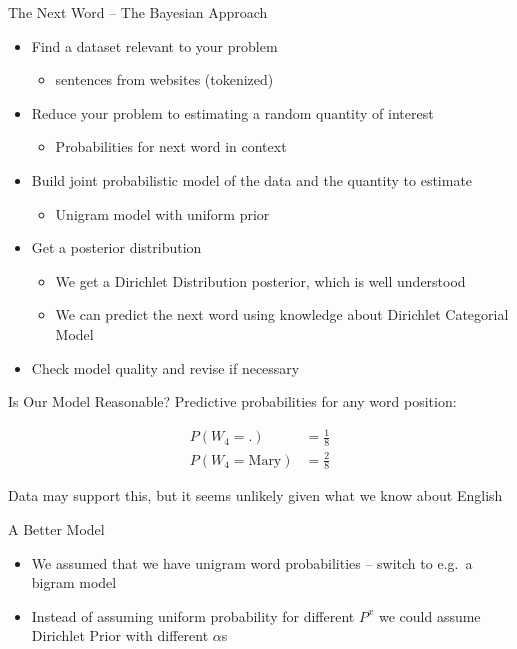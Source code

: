 \documentclass[11pt]{beamer}
\begin{document}
	\begin{frame}{The Next Word -- The Bayesian Approach}
		\centering
		\begin{itemize}
			\item Find a dataset relevant to your problem
			\begin{itemize}
				\item sentences from websites (tokenized) \checkmark
			\end{itemize}
			\item Reduce your problem to estimating a random quantity of interest
			\begin{itemize}
				\item Probabilities for next word in context \checkmark 
			\end{itemize}
			\item Build joint probabilistic model of the data and the quantity to estimate
			\begin{itemize}
				\item Unigram model with uniform prior \checkmark
			\end{itemize}
			\item<2-> Get a posterior distribution
			\begin{itemize}
				\item<2-> We get a Dirichlet Distribution posterior, which is well understood \checkmark
				\item<2-> We can predict the next word using knowledge about Dirichlet Categorial Model \checkmark
			\end{itemize}
			\item<3-> Check model quality and revise if necessary
		\end{itemize}
	\end{frame}
	
	\begin{frame}{Is Our Model Reasonable?}
		Predictive probabilities for any word position:
		
		\begin{align}
			P(W_4 = \text{.}) & = \frac{1}{8} \\
			P(W_4 = \text{Mary}) & = \frac{2}{8}
		\end{align}
		
		\vspace{10pt}Data may support this, but it seems unlikely given what we know about English
	\end{frame}
	
	\begin{frame}{A Better Model}
		\begin{itemize}
			\item We assumed that we have unigram word probabilities -- switch to e.g.\ a bigram model
			\item Instead of assuming uniform probability for different $P^{x}$ we could assume Dirichlet Prior with different $\alpha$s
		\end{itemize}
	\end{frame}
	
\end{document}
